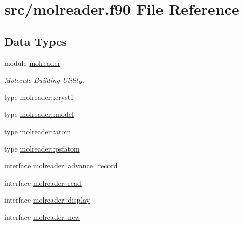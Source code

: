 \hypertarget{molreader_8f90}{\section{src/molreader.f90 File Reference}
\label{molreader_8f90}
}
\subsection*{Data Types}
\begin{DoxyCompactItemize}
\item 
module \hyperlink{classmolreader}{molreader}
\begin{DoxyCompactList}\small\item\em Molecule Building Utility. \end{DoxyCompactList}\item 
type \hyperlink{structmolreader_1_1cryst1}{molreader\-::cryst1}
\item 
type \hyperlink{structmolreader_1_1model}{molreader\-::model}
\item 
type \hyperlink{structmolreader_1_1atom}{molreader\-::atom}
\item 
type \hyperlink{structmolreader_1_1psfatom}{molreader\-::psfatom}
\item 
interface \hyperlink{interfacemolreader_1_1advance__record}{molreader\-::advance\-\_\-record}
\item 
interface \hyperlink{interfacemolreader_1_1read}{molreader\-::read}
\item 
interface \hyperlink{interfacemolreader_1_1display}{molreader\-::display}
\item 
interface \hyperlink{interfacemolreader_1_1new}{molreader\-::new}
\end{DoxyCompactItemize}
